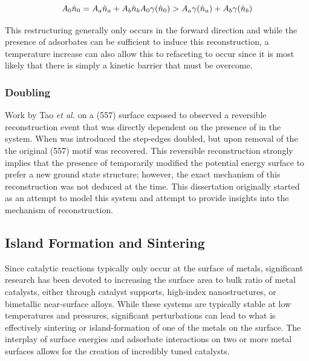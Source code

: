 \begin{equation}
A_0\hat{n}_0 = A_a\hat{n}_a + A_b\hat{n}_b \\
A_0\gamma(\hat{n}_0) > A_a\gamma(\hat{n}_a) + A_b\gamma(\hat{n}_b)
\end{equation}

This restructuring generally only occurs in the forward direction and while the
presence of adsorbates can be sufficient to induce this reconstruction, a
temperature increase can also allow this to refaceting to occur since it is
most likely that there is simply a kinetic barrier that must be overcome.\citep{Williams:1994aa, Jeong:1999ev} 

\subsubsection{Doubling}
Work by Tao {\it et al.} on a  (557) surface exposed to  observed
a reversible reconstruction event that was directly dependent on the presence
of  in the system.\citep{Tao:2011aa} When  was introduced the step-edges doubled,
but upon removal of the  the original (557) motif was recovered. This
reversible reconstruction strongly implies that the presence of 
temporarily modified the potential energy surface to prefer a new ground state
structure; however, the exact mechanism of this reconstruction was not deduced
at the time. This dissertation originally started as an attempt to model this
system and attempt to provide insights into the mechanism of reconstruction. 

\subsection{Island Formation and Sintering}
Since catalytic reactions typically only occur at the surface of metals, significant
research has been devoted to increasing the surface area to bulk ratio of metal
catalysts, either through catalyst supports, high-index nanostructures, or
bimetallic near-surface alloys. While these systems are typically stable at low
temperatures and pressures, significant perturbations can lead to what is
effectively sintering or island-formation of one of the metals on the surface.
The interplay of surface energies and adsorbate interactions on two or more
metal surfaces allows for the creation of incredibly tuned catalysts.
